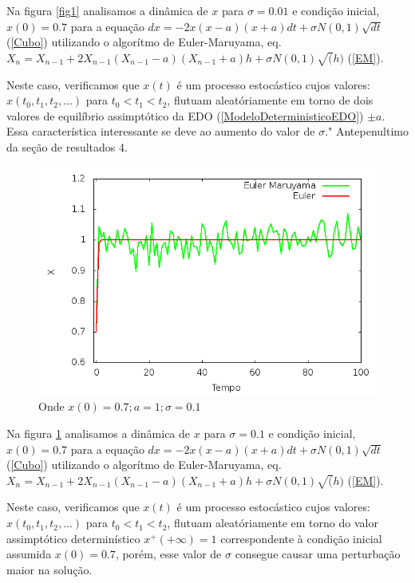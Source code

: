 Na figura \ref{fig1} analisamos a dinâmica de $x$ para $\sigma = 0.01$ e condição inicial, $x(0) = 0.7$ para a 
equação ${dx} = -2x(x-a)(x+a)dt + \sigma N(0,1) \sqrt{dt}$ (\ref{Cubo}) utilizando o algorítmo de Euler-Maruyama, 
eq. $X_n = X_{n-1} + 2X_{n-1}(X_{n-1} - a)(X_{n-1} + a)h + \sigma N(0,1) \sqrt(h)$ (\ref{EM}).

Neste caso, verificamos que $x(t)$ é um processo estocástico cujos valores: $x(t_{0}, t_{1}, t_{2},...)$ para 
$t_{0} < t_{1} < t_{2}$, flutuam aleatóriamente em torno de dois valores de equilíbrio assimptótico da EDO (\ref{ModeloDeterministicoEDO}) $ \pm a$. Essa característica interessante se deve ao aumento do valor de $\sigma$." Antepenultimo da seção de resultados 4.

\begin{figure}[!htb]
\centering
\begin{minipage}[b]{0.55\linewidth}
\includegraphics[width=\linewidth]{./img/Langevin_CI07_ruido01.png}
\caption{Onde $x(0) = 0.7 ; a = 1 ; \sigma = 0.1$}
\label{fig2}
\end{minipage} \hfill
\end{figure}

Na figura \ref{fig2} analisamos a dinâmica de $x$ para $\sigma = 0.1$ e condição inicial, $x(0) = 0.7$ para a 
equação ${dx} = -2x(x-a)(x+a)dt + \sigma N(0,1) \sqrt{dt}$ (\ref{Cubo}) utilizando o algorítmo de Euler-Maruyama, 
eq. $X_n = X_{n-1} + 2X_{n-1}(X_{n-1} - a)(X_{n-1} + a)h + \sigma N(0,1) \sqrt(h)$ (\ref{EM}).

Neste caso, verificamos que $x(t)$ é um processo estocástico cujos valores: $x(t_{0}, t_{1}, t_{2},...)$ para 
$t_{0} < t_{1} < t_{2}$, flutuam aleatóriamente em torno do valor assimptótico determinístico $x^{+}(+\infty) = 1$ correspondente à condição inicial assumida $x(0) = 0.7$, porém, esse valor de $\sigma$ consegue causar uma perturbação 
maior na solução.

